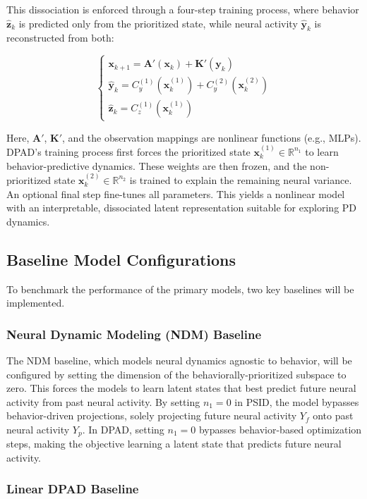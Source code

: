 \documentclass[12pt, letterpaper]{article}
\begin{document}
This dissociation is enforced through a four-step training process, where behavior $\hat{\mathbf{z}}_k$ is predicted only from the prioritized state, while neural activity $\hat{\mathbf{y}}_k$ is reconstructed from both:

$$
    \begin{cases}
        \mathbf{x}_{k+1} = \mathbf{A}'(\mathbf{x}_k) + \mathbf{K}'(\mathbf{y}_k)           \\
        \hat{\mathbf{y}}_k = C_y^{(1)}(\mathbf{x}_k^{(1)}) + C_y^{(2)}(\mathbf{x}_k^{(2)}) \\
        \hat{\mathbf{z}}_k = C_z^{(1)}(\mathbf{x}_k^{(1)})
    \end{cases}
$$

Here, $\mathbf{A}'$, $\mathbf{K}'$, and the observation mappings are nonlinear functions (e.g., MLPs). DPAD's training process first forces the prioritized state $\mathbf{x}_k^{(1)} \in \mathbb{R}^{n_1}$ to learn behavior-predictive dynamics. These weights are then frozen, and the non-prioritized state $\mathbf{x}_k^{(2)} \in \mathbb{R}^{n_2}$ is trained to explain the remaining neural variance. An optional final step fine-tunes all parameters. This yields a nonlinear model with an interpretable, dissociated latent representation suitable for exploring PD dynamics.


\subsection{Baseline Model Configurations}
To benchmark the performance of the primary models, two key baselines will be implemented.

\subsubsection{Neural Dynamic Modeling (NDM) Baseline}

The NDM baseline, which models neural dynamics agnostic to behavior, will be configured by setting the dimension of the behaviorally-prioritized subspace to zero. This forces the models to learn latent states that best predict future neural activity from past neural activity. By setting $n_1 = 0$ in PSID, the model bypasses behavior-driven projections, solely projecting future neural activity $Y_f$ onto past neural activity $Y_p$. In DPAD, setting $n_1 = 0$ bypasses behavior-based optimization steps, making the objective learning a latent state that predicts future neural activity.

\subsubsection{Linear DPAD Baseline}
\end{document}
